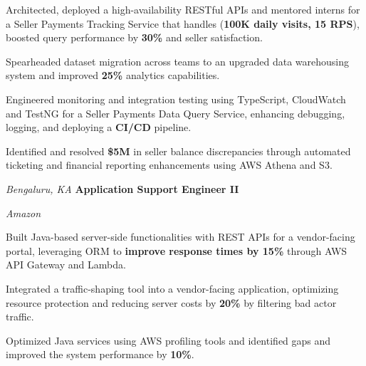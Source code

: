 \begin{onecolentry}
    \begin{highlights}
        \item Architected, deployed a high-availability RESTful APIs and mentored interns for a Seller Payments Tracking Service that handles (\textbf{100K daily visits, 15 RPS}), boosted query performance by \textbf{30\%} and seller satisfaction.
        \item Spearheaded dataset migration across teams to an upgraded data warehousing system and improved \textbf{25\%} analytics capabilities.
        \item Engineered monitoring and integration testing using TypeScript, CloudWatch and TestNG for a Seller Payments Data Query Service, enhancing debugging, logging, and deploying a \textbf{CI/CD} pipeline.
        \item Identified and resolved \textbf{\$5M} in seller balance discrepancies through automated ticketing and financial reporting enhancements using AWS Athena and S3.
    \end{highlights}
\end{onecolentry}

\vspace{0.15 cm}

\begin{twocolentry}{
    \textit{Bengaluru, KA}}
    \textbf{Application Support Engineer II}
    
    \textit{Amazon}
\end{twocolentry}

\vspace{0.15 cm}

\begin{onecolentry}
    \begin{highlights}
        \item Built Java-based server-side functionalities with REST APIs for a vendor-facing portal, leveraging ORM to \textbf{improve response times by 15\%} through AWS API Gateway and Lambda.
        \item Integrated a traffic-shaping tool into a vendor-facing application, optimizing resource protection and reducing server costs by \textbf{20\%} by filtering bad actor traffic.
        \item Optimized Java services using AWS profiling tools and identified gaps and improved the system performance by \textbf{10\%}.
    \end{highlights}
\end{onecolentry}
